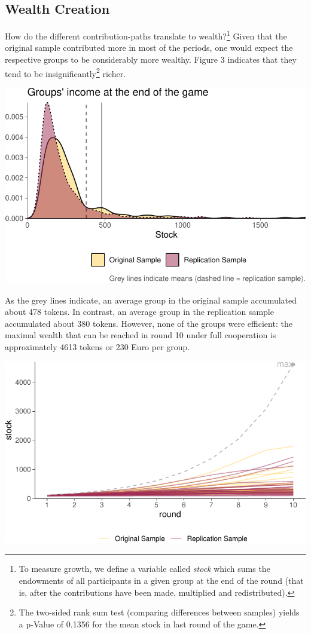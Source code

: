 \documentclass[
  authoryear,
  preprint,
  3p]{elsarticle}
\begin{document}
\hypertarget{wealth-creation}{%
\subsection{Wealth Creation}\label{wealth-creation}}

How do the different contribution-paths translate to wealth?\footnote{To
  measure growth, we define a variable called \emph{stock} which sums
  the endowments of all participants in a given group at the end of the
  round (that is, after the contributions have been made, multiplied and
  redistributed).} Given that the original sample contributed more in
most of the periods, one would expect the respective groups to be
considerably more wealthy. Figure 3 indicates that they tend to be
insignificantly\footnote{The two-sided rank sum test (comparing
  differences between samples) yields a p-Value of 0.1356 for the mean
  stock in last round of the game.} richer.

\includegraphics{paper_files/figure-pdf/stockDistributionViz-1.pdf}

As the grey lines indicate, an average group in the original sample
accumulated about 478 tokens. In contrast, an average group in the
replication sample accumulated about 380 tokens. However, none of the
groups were efficient: the maximal wealth that can be reached in round
10 under full cooperation is approximately 4613 tokens or 230 Euro per
group.

\includegraphics{paper_files/figure-pdf/growthHeterogeneityViz-1.pdf}
\end{document}
